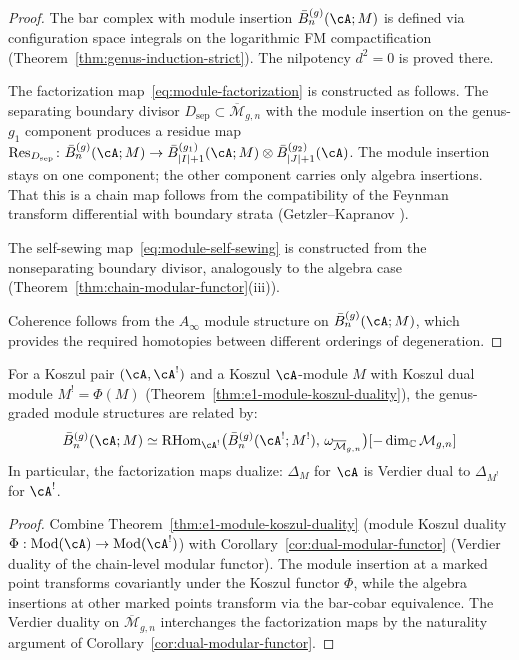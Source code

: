 \begin{proof}
The bar complex with module insertion
$\bar{B}^{(g)}_n(\cA; M)$ is defined via configuration space
integrals on the logarithmic FM compactification
(Theorem~\ref{thm:genus-induction-strict}).  The nilpotency
$d^2 = 0$ is proved there.

The factorization map~\eqref{eq:module-factorization} is
constructed as follows.  The separating boundary divisor
$D_{\mathrm{sep}} \subset \overline{\mathcal{M}}_{g,n}$ with
the module insertion on the genus-$g_1$ component produces a
residue map
$\mathrm{Res}_{D_{\mathrm{sep}}}\colon
\bar{B}^{(g)}_n(\cA; M) \to
\bar{B}^{(g_1)}_{|I|+1}(\cA; M) \otimes
\bar{B}^{(g_2)}_{|J|+1}(\cA)$.
The module insertion stays on one component; the other component
carries only algebra insertions.  That this is a chain map follows
from the compatibility of the Feynman transform differential with
boundary strata (Getzler--Kapranov \cite{GeK98}).

The self-sewing map~\eqref{eq:module-self-sewing} is constructed
from the nonseparating boundary divisor, analogously to the
algebra case (Theorem~\ref{thm:chain-modular-functor}(iii)).

Coherence follows from the $A_\infty$ module structure on
$\bar{B}^{(g)}_n(\cA; M)$, which provides the required
homotopies between different orderings of degeneration.
\end{proof}

\begin{proposition}\label{prop:genus-module-koszul}
For a Koszul pair $(\cA, \cA^!)$ and a Koszul $\cA$-module $M$
with Koszul dual module $M^! = \Phi(M)$
\textup{(}Theorem~\textup{\ref{thm:e1-module-koszul-duality})},
the genus-graded module structures are related by:
\begin{equation}\label{eq:genus-module-duality}
\bar{B}^{(g)}_n(\cA; M) \simeq
\mathrm{RHom}_{\cA^!}\bigl(\bar{B}^{(g)}_n(\cA^!; M^!),\,
\omega_{\overline{\mathcal{M}}_{g,n}}\bigr)
[-\dim_{\mathbb{C}} \mathcal{M}_{g,n}]
\end{equation}
In particular, the factorization maps dualize:
$\Delta_M$ for $\cA$ is Verdier dual to $\Delta_{M^!}$ for $\cA^!$.
\end{proposition}

\begin{proof}
Combine Theorem~\ref{thm:e1-module-koszul-duality} (module Koszul
duality $\Phi: \mathrm{Mod}(\cA) \to \mathrm{Mod}(\cA^!)$)
with Corollary~\ref{cor:dual-modular-functor} (Verdier duality of
the chain-level modular functor).  The module insertion at a marked
point transforms covariantly under the Koszul functor $\Phi$,
while the algebra insertions at other marked points transform via
the bar-cobar equivalence.  The Verdier duality on
$\overline{\mathcal{M}}_{g,n}$ interchanges the factorization
maps by the naturality argument of
Corollary~\ref{cor:dual-modular-functor}.
\end{proof}

